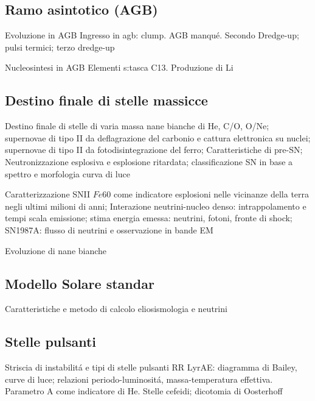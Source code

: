 \subsection{Ramo asintotico (AGB)}

\begin{frame}{Evoluzione in AGB}
Ingresso in agb: clump. AGB manqu\'e. Secondo Dredge-up; pulsi termici; terzo dredge-up
\end{frame}

\begin{frame}{Nucleosintesi in AGB}
Elementi s:tasca C13. Produzione di Li
\end{frame}

\subsection{Destino finale di stelle massicce}

\begin{frame}{Destino finale di stelle di varia massa}
nane bianche di He, C/O, O/Ne; supernovae di tipo II da deflagrazione del carbonio e cattura elettronica su nuclei; supernovae di tipo II da fotodisintegrazione del ferro; Caratteristiche di pre-SN; Neutronizzazione esplosiva e esplosione ritardata; classificazione SN in base a spettro e morfologia curva di luce
\end{frame}

\begin{frame}{Caratterizzazione SNII}
$Fe60$ come indicatore esplosioni nelle vicinanze della terra negli ultimi milioni di anni; Interazione neutrini-nucleo denso: intrappolamento e tempi scala emissione; stima energia emessa: neutrini, fotoni, fronte di shock; SN1987A: flusso di neutrini e osservazione in bande EM
\end{frame}


\begin{frame}{Evoluzione di nane bianche}

\end{frame}

\subsection{Modello Solare standar}

\begin{frame}{Caratteristiche e metodo di calcolo}
eliosismologia e neutrini
\end{frame}

\subsection{Stelle pulsanti}

\begin{frame}{Striscia di instabilit\'a e tipi di stelle pulsanti}
RR LyrAE: diagramma di Bailey, curve di luce; relazioni periodo-luminosit\'a, massa-temperatura effettiva.
Parametro A come indicatore di He.
Stelle cefeidi; dicotomia di Oosterhoff
\end{frame}